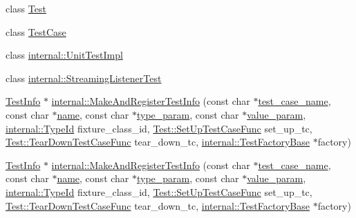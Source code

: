 \begin{DoxyCompactItemize}
\item 
class \hyperlink{classtesting_1_1_test_info_ab085d1bf4cff8b1045750706b11f8662}{Test}
\item 
class \hyperlink{classtesting_1_1_test_info_a61fe0349d692eb6d4f5b94e35049b2e9}{Test\-Case}
\item 
class \hyperlink{classtesting_1_1_test_info_aa684cc13a8f91b00c0c9ce41ec7474eb}{internal\-::\-Unit\-Test\-Impl}
\item 
class \hyperlink{classtesting_1_1_test_info_a2021083660b7387a257fb6c6242fee73}{internal\-::\-Streaming\-Listener\-Test}
\item 
\hyperlink{classtesting_1_1_test_info}{Test\-Info} $\ast$ \hyperlink{classtesting_1_1_test_info_a3e27fa5e97044d379b1e3b2a753f56f8}{internal\-::\-Make\-And\-Register\-Test\-Info} (const char $\ast$\hyperlink{classtesting_1_1_test_info_a26d22556d04b94c9cd15e28d74fef91c}{test\-\_\-case\-\_\-name}, const char $\ast$\hyperlink{classtesting_1_1_test_info_ab3d24cad310f0cde29a80b9a83949ff5}{name}, const char $\ast$\hyperlink{classtesting_1_1_test_info_af15d5c533a7237ffc183bc4c924dfcf4}{type\-\_\-param}, const char $\ast$\hyperlink{classtesting_1_1_test_info_a9671fbc0effcb32e98803888dc166a66}{value\-\_\-param}, \hyperlink{namespacetesting_1_1internal_a38c435cbab5f8b784e2e7f3356cab242}{internal\-::\-Type\-Id} fixture\-\_\-class\-\_\-id, \hyperlink{classtesting_1_1_test_a5f2a051d1d99c9b784c666c586186cf9}{Test\-::\-Set\-Up\-Test\-Case\-Func} set\-\_\-up\-\_\-tc, \hyperlink{classtesting_1_1_test_aa0f532e93b9f3500144c53f31466976c}{Test\-::\-Tear\-Down\-Test\-Case\-Func} tear\-\_\-down\-\_\-tc, \hyperlink{classtesting_1_1internal_1_1_test_factory_base}{internal\-::\-Test\-Factory\-Base} $\ast$factory)
\item 
\hyperlink{classtesting_1_1_test_info}{Test\-Info} $\ast$ \hyperlink{classtesting_1_1_test_info_a3e27fa5e97044d379b1e3b2a753f56f8}{internal\-::\-Make\-And\-Register\-Test\-Info} (const char $\ast$\hyperlink{classtesting_1_1_test_info_a26d22556d04b94c9cd15e28d74fef91c}{test\-\_\-case\-\_\-name}, const char $\ast$\hyperlink{classtesting_1_1_test_info_ab3d24cad310f0cde29a80b9a83949ff5}{name}, const char $\ast$\hyperlink{classtesting_1_1_test_info_af15d5c533a7237ffc183bc4c924dfcf4}{type\-\_\-param}, const char $\ast$\hyperlink{classtesting_1_1_test_info_a9671fbc0effcb32e98803888dc166a66}{value\-\_\-param}, \hyperlink{namespacetesting_1_1internal_a38c435cbab5f8b784e2e7f3356cab242}{internal\-::\-Type\-Id} fixture\-\_\-class\-\_\-id, \hyperlink{classtesting_1_1_test_a5f2a051d1d99c9b784c666c586186cf9}{Test\-::\-Set\-Up\-Test\-Case\-Func} set\-\_\-up\-\_\-tc, \hyperlink{classtesting_1_1_test_aa0f532e93b9f3500144c53f31466976c}{Test\-::\-Tear\-Down\-Test\-Case\-Func} tear\-\_\-down\-\_\-tc, \hyperlink{classtesting_1_1internal_1_1_test_factory_base}{internal\-::\-Test\-Factory\-Base} $\ast$factory)
\end{DoxyCompactItemize}


